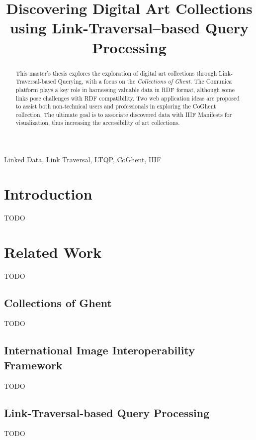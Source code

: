 \documentclass[conference]{IEEEtran}
\begin{document}

\title{Discovering Digital Art Collections using Link-Traversal–based Query Processing}

\author{
}

\maketitle

\begin{abstract}
This master's thesis explores the exploration of digital art collections through Link-Traversal-based Querying, with a focus on the \textit{Collections of Ghent}. The Comunica platform plays a key role in harnessing valuable data in RDF format, although some links pose challenges with RDF compatibility. Two web application ideas are proposed to assist both non-technical users and professionals in exploring the CoGhent collection. The ultimate goal is to associate discovered data with IIIF Manifests for visualization, thus increasing the accessibility of art collections.
\end{abstract}

\begin{IEEEkeywords}
Linked Data, Link Traversal, LTQP, CoGhent, IIIF
\end{IEEEkeywords}

\section*{Introduction}
TODO

\section{Related Work}
TODO

\subsection{Collections of Ghent}
TODO

\subsection{International Image Interoperability Framework}
TODO

\subsection{Link-Traversal-based Query Processing}
TODO
\end{document}

